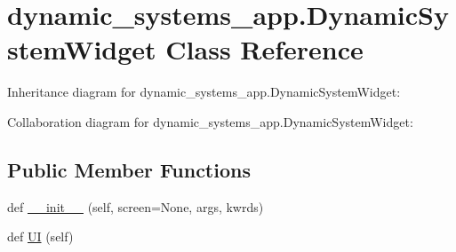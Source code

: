 \hypertarget{classdynamic__systems__app_1_1DynamicSystemWidget}{}\section{dynamic\+\_\+systems\+\_\+app.\+Dynamic\+System\+Widget Class Reference}
\label{classdynamic__systems__app_1_1DynamicSystemWidget}


Inheritance diagram for dynamic\+\_\+systems\+\_\+app.\+Dynamic\+System\+Widget\+:


Collaboration diagram for dynamic\+\_\+systems\+\_\+app.\+Dynamic\+System\+Widget\+:
\subsection*{Public Member Functions}
\begin{DoxyCompactItemize}
\item 
def \hyperlink{classdynamic__systems__app_1_1DynamicSystemWidget_a78d756d1c82b28bf8201c21227b4a7d2}{\+\_\+\+\_\+init\+\_\+\+\_\+} (self, screen=None, args, kwrds)
\item 
def \hyperlink{classdynamic__systems__app_1_1DynamicSystemWidget_a4a9ba786a3c93fac5257c0dc2c984e43}{UI} (self)
\end{DoxyCompactItemize}
